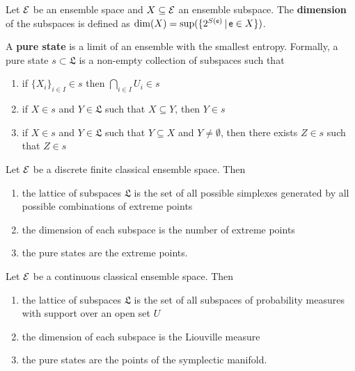 \begin{defn}
	Let $\mathcal{E}$ be an ensemble space and $X \subseteq \mathcal{E}$ an ensemble subspace. The \textbf{dimension} of the subspaces is defined as $\dim(X) = \sup(\{2^{S(\mathsf{e})} \, | \, \mathsf{e} \in X\})$.
\end{defn}

\begin{defn}
	A \textbf{pure state} is a limit of an ensemble with the smallest entropy. Formally, a pure state $s \subset \mathfrak{L}$ is a non-empty collection of subspaces such that
	\begin{enumerate}
		\item if $\{X_i\}_{i \in I} \in s$ then $\bigcap_{i \in I} U_i \in s$
		\item if $X \in s$ and $Y \in \mathfrak{L}$ such that $X \subseteq Y$, then $Y \in s$
		\item if $X \in s$ and $Y \in \mathfrak{L}$ such that $Y \subseteq X$ and $Y \neq \emptyset$, then there exists $Z \in s$ such that $Z \in s$
	\end{enumerate}
\end{defn}

\begin{conj}
	Let $\mathcal{E}$ be a discrete finite classical ensemble space. Then
	\begin{enumerate}
		\item the lattice of subspaces $\mathfrak{L}$ is the set of all possible simplexes generated by all possible combinations of extreme points
		\item the dimension of each subspace is the number of extreme points
		\item the pure states are the extreme points.
	\end{enumerate}
\end{conj}

\begin{conj}
	Let $\mathcal{E}$ be a continuous classical ensemble space. Then
	\begin{enumerate}
		\item the lattice of subspaces $\mathfrak{L}$ is the set of all subspaces of probability measures with support over an open set $U$
		\item the dimension of each subspace is the Liouville measure
		\item the pure states are the points of the symplectic manifold.
	\end{enumerate}
\end{conj}

